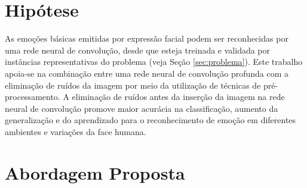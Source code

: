 \section{Hipótese}
As emoções básicas emitidas por expressão facial podem ser reconhecidas por uma rede neural de convolução, desde que esteja treinada e validada por instâncias representativas do problema (veja Seção \ref{sec:problema}). Este trabalho apoia-se na combinação entre uma rede neural de convolução profunda com a eliminação de ruídos da imagem por meio da utilização de técnicas de pré-processamento. A eliminação de ruídos antes da inserção da imagem na rede neural de convolução promove maior acurácia na classificação, aumento da generalização e do aprendizado para o reconhecimento de emoção em diferentes ambientes e variações da face humana.  


\section{Abordagem Proposta}\label{sec:abordagemproposta}

